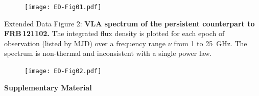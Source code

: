 \documentclass{nature_frb}
\newcommand{\frb}{FRB\,121102}
\begin{document}
\begin{figure}
\begin{center}
\texttt{[image: ED-Fig01.pdf]}
\end{center}
\label{fig:centroid}
\end{figure}




\clearpage
\bigskip\noindent
Extended Data Figure 2: {\bf VLA spectrum of the persistent counterpart to \frb.}
The integrated flux density is plotted for each epoch of observation (listed by MJD) over a frequency range $\nu$ from 1 to 25~GHz. The spectrum is non-thermal and inconsistent with a single power law.

\begin{figure}
\begin{center}
\texttt{[image: ED-Fig02.pdf]}
\end{center}
\label{fig:vlaspectrum}
\end{figure}



\clearpage
\noindent
\large{\bf Supplementary Material}
\end{document}
